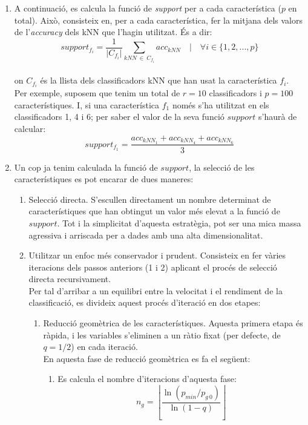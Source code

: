 \documentclass{article} %
\begin{document}
{\begin{enumerate}
		\item{
			A continuació, es calcula la funció de \textit{support} per a cada característica ($p$ en total). Això, consisteix en, per a cada característica, fer la mitjana dels valors de l'\textit{accuracy} dels kNN que l'hagin utilitzat. És a dir:\\
			\[support_{f_i} = \frac{1}{\lvert C_{f_i}\lvert} \sum_{kNN\ \in\ C_{f_i}}^{} acc_{kNN} \quad \lvert \quad \forall i \in \{1, 2, ..., p\}\] \\
			on $C_{f_i}$ és la llista dels classificadors kNN que han usat la característica $f_i$. \\
			Per exemple, suposem que tenim un total de $r = 10$ classificadors i $p = 100$ característiques. I, si una característica $f_1$ només s'ha utilitzat en els classificadors 1, 4 i 6; per saber el valor de la seva funció $support$ s'haurà de calcular: \[support_{f_1} = \frac{acc_{kNN_1} + acc_{kNN_4} + acc_{kNN_6}}{3}\]
		}
		\item {
			Un cop ja tenim calculada la funció de $support$, la selecció de les característiques es pot encarar de dues maneres:
			\begin{enumerate}
				\item Selecció directa. S'escullen directament un nombre determinat de característiques que han obtingut un valor més elevat a la funció de $support$. Tot i la simplicitat d'aquesta estratègia, pot ser una mica massa agressiva i arriscada per a dades amb una alta dimensionalitat.
				\item{
					Utilitzar un enfoc més conservador i prudent. Consisteix en fer vàries iteracions dels passos anteriors (1 i 2) aplicant el procés de selecció directa recursivament. \\
					Per tal d'arribar a un equilibri entre la velocitat i el rendiment de la classificació, es divideix aquest procés d'iteració en dos etapes:
					\begin{enumerate}
						\item {
							Reducció geomètrica de les característiques. Aquesta primera etapa és ràpida, i les variables s'eliminen a un ràtio fixat (per defecte, de $q = 1/2$) en cada iteració. \\
							En aquesta fase de reducció geomètrica es fa el següent:
							\begin{enumerate}
								\item {
									Es calcula el nombre d'iteracions d'aquesta fase:
									\[n_g = \left \lfloor{\frac{\ln(p_{min}/p_{g\ 0})}{\ln(1-q)}}\right \rfloor \]
}
\end{enumerate}}
\end{enumerate}}
\end{enumerate}}
\end{enumerate}}
\end{document}
